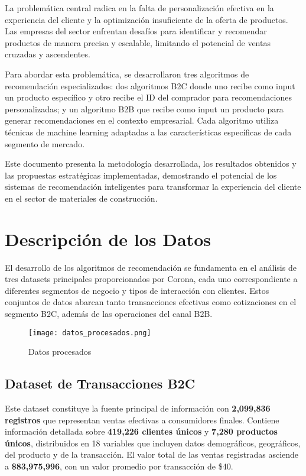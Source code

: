 \documentclass[twocolumn]{article}
\begin{document}
La problemática central radica en la falta de personalización efectiva en la experiencia del cliente y la optimización insuficiente de la oferta de productos. Las empresas del sector enfrentan desafíos para identificar y recomendar productos de manera precisa y escalable, limitando el potencial de ventas cruzadas y ascendentes.

Para abordar esta problemática, se desarrollaron tres algoritmos de recomendación especializados: dos algoritmos B2C donde uno recibe como input un producto específico y otro recibe el ID del comprador para recomendaciones personalizadas; y un algoritmo B2B que recibe como input un producto para generar recomendaciones en el contexto empresarial. Cada algoritmo utiliza técnicas de machine learning adaptadas a las características específicas de cada segmento de mercado.

Este documento presenta la metodología desarrollada, los resultados obtenidos y las propuestas estratégicas implementadas, demostrando el potencial de los sistemas de recomendación inteligentes para transformar la experiencia del cliente en el sector de materiales de construcción.

\section{Descripción de los Datos}

El desarrollo de los algoritmos de recomendación se fundamenta en el análisis de tres datasets principales proporcionados por Corona, cada uno correspondiente a diferentes segmentos de negocio y tipos de interacción con clientes. Estos conjuntos de datos abarcan tanto transacciones efectivas como cotizaciones en el segmento B2C, además de las operaciones del canal B2B.
\begin{figure}
    \centering
    \texttt{[image: datos\_procesados.png]}
    \caption{Datos procesados}
    \label{fig:enter-label}
\end{figure}
\subsection{Dataset de Transacciones B2C}

Este dataset constituye la fuente principal de información con \textbf{2,099,836 registros} que representan ventas efectivas a consumidores finales. Contiene información detallada sobre \textbf{419,226 clientes únicos} y \textbf{7,280 productos únicos}, distribuidos en 18 variables que incluyen datos demográficos, geográficos, del producto y de la transacción. El valor total de las ventas registradas asciende a \textbf{\$83,975,996}, con un valor promedio por transacción de \$40.
\end{document}
